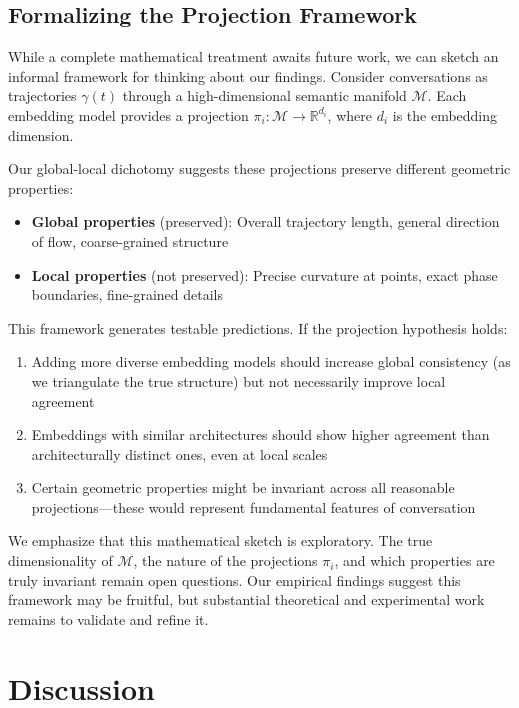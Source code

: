 \documentclass[11pt,letterpaper]{article}
\begin{document}
\subsection{Formalizing the Projection Framework}

While a complete mathematical treatment awaits future work, we can sketch an informal framework for thinking about our findings. Consider conversations as trajectories $\gamma(t)$ through a high-dimensional semantic manifold $\mathcal{M}$. Each embedding model provides a projection $\pi_i: \mathcal{M} \to \mathbb{R}^{d_i}$, where $d_i$ is the embedding dimension.

Our global-local dichotomy suggests these projections preserve different geometric properties:
\begin{itemize}
\item \textbf{Global properties} (preserved): Overall trajectory length, general direction of flow, coarse-grained structure
\item \textbf{Local properties} (not preserved): Precise curvature at points, exact phase boundaries, fine-grained details
\end{itemize}

This framework generates testable predictions. If the projection hypothesis holds:
\begin{enumerate}
\item Adding more diverse embedding models should increase global consistency (as we triangulate the true structure) but not necessarily improve local agreement
\item Embeddings with similar architectures should show higher agreement than architecturally distinct ones, even at local scales
\item Certain geometric properties might be invariant across all reasonable projections—these would represent fundamental features of conversation
\end{enumerate}

We emphasize that this mathematical sketch is exploratory. The true dimensionality of $\mathcal{M}$, the nature of the projections $\pi_i$, and which properties are truly invariant remain open questions. Our empirical findings suggest this framework may be fruitful, but substantial theoretical and experimental work remains to validate and refine it.

\section{Discussion}
\end{document}
